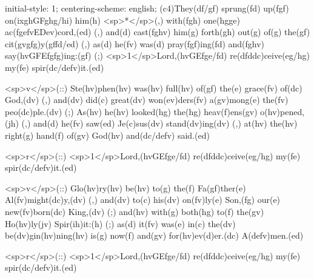 initial-style: 1;
centering-scheme: english;
(c4)They(df/gf) sprung(fd) up(fgf) on(ixghGFghg/hi) him(h) <sp>*</sp>(,) with(fgh) one(hgge) ac(fgefvEDev)cord,(ed) (,) and(d) cast(fghv) him(g) forth(gh) out(g) of(g) the(gf) cit(gvgfg)y(gffd/ed) (,) as(d) he(fv) was(d) pray(fgf)ing(fd) and(fghv) say(hvGFEfgfg)ing:(gf) (;) <sp>1</sp>Lord,(hvGEfge/fd) re(dfddc)ceive(eg/hg) my(fe) spir(dc/defv)it.(ed) 

<sp>v</sp>(::) Ste(hv)phen(hv) was(hv) full(hv) of(gf) the(e) grace(fv) of(dc) God,(dv) (,) and(dv) did(c) great(dv) won(ev)ders(fv) a(gv)mong(e) the(fv) peo(dc)ple.(dv) (;) As(hv) he(hv) looked(hg) the(hg) heav(f)ens(gv) o(hv)pened,(jh) (,) and(d) he(fv) saw(ed) Je(c)sus(dv) stand(dv)ing(dv) (,) at(hv) the(hv) right(g) hand(f) of(gv) God(hv) and(dc/defv) said.(ed) 

<sp>r</sp>(::) <sp>1</sp>Lord,(hvGEfge/fd) re(dfddc)ceive(eg/hg) my(fe) spir(dc/defv)it.(ed) 

<sp>v</sp>(::) Glo(hv)ry(hv) be(hv) to(g) the(f) Fa(gf)ther(e) Al(fv)might(dc)y,(dv) (,) and(dv) to(c) his(dv) on(fv)ly(e) Son,(fg) our(e) new(fv)born(dc) King,(dv) (;) and(hv) with(g) both(hg) to(f) the(gv) Ho(hv)ly(jv) Spir(ih)it:(h) (;) as(d) it(fv) was(e) in(c) the(dv) be(dv)gin(hv)ning(hv) is(g) now(f) and(gv) for(hv)ev(d)er.(dc) A(defv)men.(ed)

<sp>r</sp>(::) <sp>1</sp>Lord,(hvGEfge/fd) re(dfddc)ceive(eg/hg) my(fe) spir(dc/defv)it.(ed) 